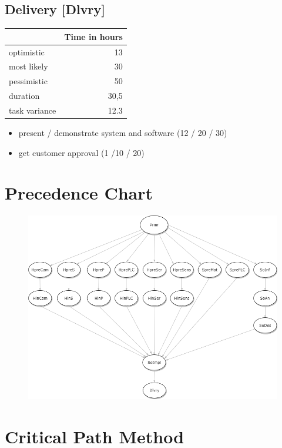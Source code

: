 \subsection*{Delivery [Dlvry]}
\label{sec:org1388080}
\begin{center}
\begin{tabular}{|l|r|}
	\hline
	& Time in hours\\
	\hline
	optimistic & 13\\
	\hline
	most likely & 30\\
	\hline
	pessimistic & 50\\
	\hline
	\hline
	duration & 30,5\\
	\hline
	task variance & 12.3\\
	\hline
\end{tabular}
\end{center}
\begin{itemize}
\item present / demonstrate system and software (12 / 20 / 30)
\item get customer approval (1 /10 / 20)
\end{itemize}
\newpage

\section{Precedence Chart}
\begin{figure}[h]
	\centering
	\includegraphics[width=\textwidth]{images/precedenceChart}
\end{figure}

\section{Critical Path Method}

